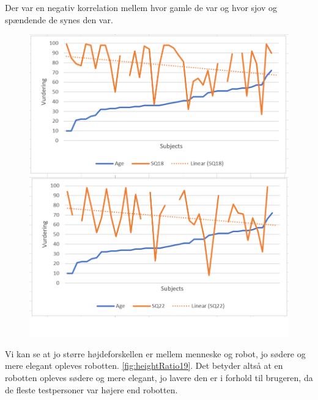 Der var en negativ korrelation mellem hvor gamle de var og hvor sjov og spændende de synes den var. 

\begin{figure}[H]
\centering
\includegraphics[width=\textwidth]{Figure/DatabehandlingSkalaer/Demografi/age18_22.png}
\caption{}
\label{fig:age18_22}
\end{figure}
\noindent

 Vi kan se at jo større højdeforskellen er mellem menneske og robot, jo sødere og mere elegant opleves robotten. \autoref{fig:heightRatio19}. Det betyder altså at en robotten opleves sødere og mere elegant, jo lavere den er i forhold til brugeren, da de fleste testpersoner var højere end robotten.

